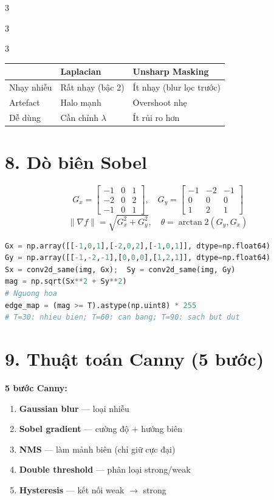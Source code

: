 \documentclass[9pt,landscape,a4paper]{extarticle}
\begin{document}
\begin{multicols*}{3}
\begin{multicols*}{3}
\begin{multicols}{3}
\begin{center}\small
\begin{tabular}{@{}lll@{}}
\toprule
 & Laplacian & Unsharp Masking \\
\midrule
Nhạy nhiễu & Rất nhạy (bậc 2) & Ít nhạy (blur lọc trước) \\
Artefact & Halo mạnh & Overshoot nhẹ \\
Dễ dùng & Cần chỉnh $\lambda$ & Ít rủi ro hơn \\
\bottomrule
\end{tabular}
\end{center}

\section{8. Dò biên Sobel}

\[
G_x=\begin{bmatrix}-1&0&1\\-2&0&2\\-1&0&1\end{bmatrix},\quad
G_y=\begin{bmatrix}-1&-2&-1\\0&0&0\\1&2&1\end{bmatrix}
\]
\[
  \|\nabla f\| = \sqrt{G_x^2+G_y^2}, \quad
  \theta = \arctan2(G_y, G_x)
\]

\begin{lstlisting}[language=Python]
Gx = np.array([[-1,0,1],[-2,0,2],[-1,0,1]], dtype=np.float64)
Gy = np.array([[-1,-2,-1],[0,0,0],[1,2,1]], dtype=np.float64)
Sx = conv2d_same(img, Gx);  Sy = conv2d_same(img, Gy)
mag = np.sqrt(Sx**2 + Sy**2)
# Nguong hoa
edge_map = (mag >= T).astype(np.uint8) * 255
# T=30: nhieu bien; T=60: can bang; T=90: sach but dut
\end{lstlisting}

\section{9. Thuật toán Canny (5 bước)}

\begin{infobox}
\textbf{5 bước Canny:}
\begin{enumerate}
  \item \textbf{Gaussian blur} --- loại nhiễu
  \item \textbf{Sobel gradient} --- cường độ + hướng biên
  \item \textbf{NMS} --- làm mảnh biên (chỉ giữ cực đại)
  \item \textbf{Double threshold} --- phân loại strong/weak
  \item \textbf{Hysteresis} --- kết nối weak $\to$ strong
\end{enumerate}
\end{infobox}


\end{multicols}
\end{multicols*}
\end{multicols*}
\end{document}
